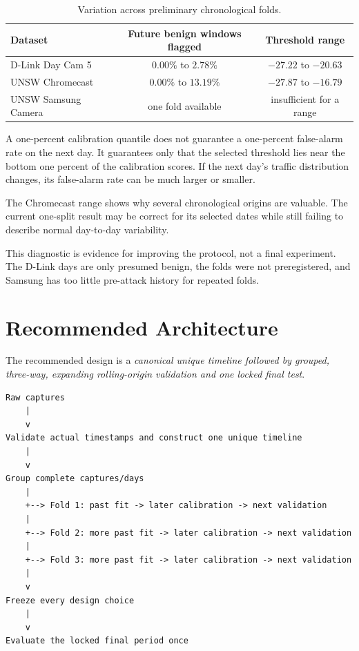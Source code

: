 \documentclass[11pt,a4paper]{article}
\begin{document}
\begin{table}[ht]
\centering
\caption{Variation across preliminary chronological folds.}
\begin{tabular}{lcc}
\toprule
Dataset & Future benign windows flagged & Threshold range \\
\midrule
D-Link Day Cam 5 & $0.00\%$ to $2.78\%$ & $-27.22$ to $-20.63$ \\
UNSW Chromecast & $0.00\%$ to $13.19\%$ & $-27.87$ to $-16.79$ \\
UNSW Samsung Camera & one fold available & insufficient for a range \\
\bottomrule
\end{tabular}
\end{table}

A one-percent calibration quantile does not guarantee a one-percent false-alarm
rate on the next day. It guarantees only that the selected threshold lies near
the bottom one percent of the calibration scores. If the next day's traffic
distribution changes, its false-alarm rate can be much larger or smaller.

The Chromecast range shows why several chronological origins are valuable. The
current one-split result may be correct for its selected dates while still
failing to describe normal day-to-day variability.

This diagnostic is evidence for improving the protocol, not a final experiment.
The D-Link days are only presumed benign, the folds were not preregistered, and
Samsung has too little pre-attack history for repeated folds.

\section{Recommended Architecture}

The recommended design is a \emph{canonical unique timeline followed by
grouped, three-way, expanding rolling-origin validation and one locked final
test}.

\begin{verbatim}
Raw captures
    |
    v
Validate actual timestamps and construct one unique timeline
    |
    v
Group complete captures/days
    |
    +--> Fold 1: past fit -> later calibration -> next validation
    |
    +--> Fold 2: more past fit -> later calibration -> next validation
    |
    +--> Fold 3: more past fit -> later calibration -> next validation
    |
    v
Freeze every design choice
    |
    v
Evaluate the locked final period once
\end{verbatim}
\end{document}
